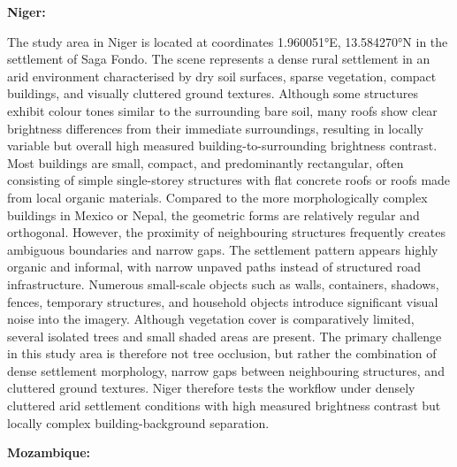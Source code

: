 \textbf{Niger:}

The study area in Niger is located at coordinates 1.960051°E, 13.584270°N in the settlement of Saga Fondo. The scene represents a dense rural settlement in an arid environment characterised by dry soil surfaces, sparse vegetation, compact buildings, and visually cluttered ground textures. Although some structures exhibit colour tones similar to the surrounding bare soil, many roofs show clear brightness differences from their immediate surroundings, resulting in locally variable but overall high measured building-to-surrounding brightness contrast. Most buildings are small, compact, and predominantly rectangular, often consisting of simple single-storey structures with flat concrete roofs or roofs made from local organic materials. Compared to the more morphologically complex buildings in Mexico or Nepal, the geometric forms are relatively regular and orthogonal. However, the proximity of neighbouring structures frequently creates ambiguous boundaries and narrow gaps. The settlement pattern appears highly organic and informal, with narrow unpaved paths instead of structured road infrastructure. Numerous small-scale objects such as walls, containers, shadows, fences, temporary structures, and household objects introduce significant visual noise into the imagery. Although vegetation cover is comparatively limited, several isolated trees and small shaded areas are present. The primary challenge in this study area is therefore not tree occlusion, but rather the combination of dense settlement morphology, narrow gaps between neighbouring structures, and cluttered ground textures. Niger therefore tests the workflow under densely cluttered arid settlement conditions with high measured brightness contrast but locally complex building-background separation.

\textbf{Mozambique:}

